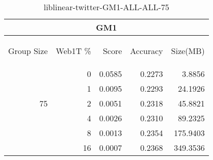 \begin{center}
\begin{table}[htbp]
\begin{tabular}{ | r | r | r | r | r |}
\hline
\multicolumn{5}{|c|}{GM1}\\
\hline
\begin{sideways}Group Size\end{sideways} & \begin{sideways}Web1T \%\end{sideways} & \begin{sideways}Score\end{sideways} & \begin{sideways}Accuracy\end{sideways} & \begin{sideways}Size(MB)\end{sideways}\\
\hline
\multirow{5}{*}{75}
 & 0 & 0.0585 & 0.2273 & 3.8856\\ \cline{2-5}
 & 1 & 0.0095 & 0.2293 & 24.1926\\ \cline{2-5}
 & 2 & 0.0051 & 0.2318 & 45.8821\\ \cline{2-5}
 & 4 & 0.0026 & 0.2310 & 89.2325\\ \cline{2-5}
 & 8 & 0.0013 & 0.2354 & 175.9403\\ \cline{2-5}
 & 16 & 0.0007 & 0.2368 & 349.3536\\ \cline{2-5}
\hline
\end{tabular}
\caption{liblinear-twitter-GM1-ALL-ALL-75}
\label{table:liblinear-twitter-GM1-ALL-ALL-75}
\end{table}
\end{center}

